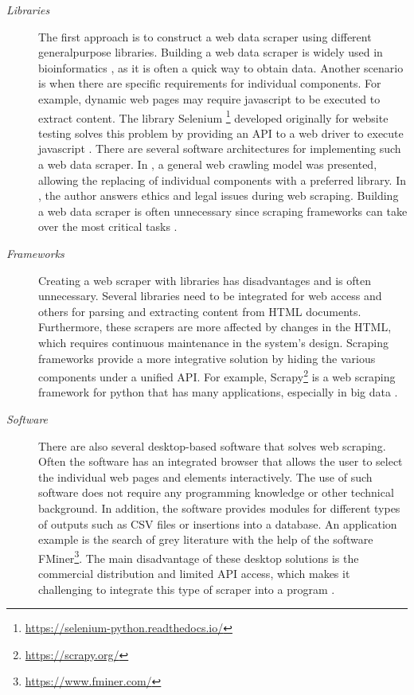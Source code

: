\begin{description}
    \item[\textit{Libraries}]\label{itm:libraries} The first approach is to construct a web data scraper using different general\-purpose libraries.
    Building a web data scraper is widely used in bioinformatics \cite{glez2014web}, as it is often a quick way to obtain data.
    Another scenario is when there are specific requirements for individual components.
    For example, dynamic web pages may require javascript to be executed to extract content.
    The library Selenium \footnote{\url{https://selenium-python.readthedocs.io/}} developed originally for website testing solves this problem by providing an \ac{API} to a web driver to execute javascript \cite{mitchell2018web}.
    There are several software architectures for implementing such a web data scraper.
    In \cite{mitchell2018web}, a general web crawling model was presented, allowing the replacing of individual components with a preferred library.
    In \cite{mahto2016dive}, the author answers ethics and legal issues during web scraping.
    Building a web data scraper is often unnecessary since scraping frameworks can take over the most critical tasks \cite{mitchell2018web}.
    \item[\textit{Frameworks}]\label{itm:frameworks} Creating a web scraper with libraries has disadvantages and is often unnecessary.
    Several libraries need to be integrated for web access and others for parsing and extracting content from \ac{HTML} documents.
    Furthermore, these scrapers are more affected by changes in the \ac{HTML}, which requires continuous maintenance in the system's design.
    Scraping frameworks provide a more integrative solution by hiding the various components under a unified \ac{API}.
    For example, Scrapy\footnote{\url{https://scrapy.org/}} is a web scraping framework for python that has many applications, especially in big data \cite{chaulagain2017cloud, landers2016primer}.
    \item[\textit{Software}]\label{itm:software} There are also several desktop-based software that solves web scraping.
    Often the software has an integrated browser that allows the user to select the individual web pages and elements interactively.
    The use of such software does not require any programming knowledge or other technical background.
    In addition, the software provides modules for different types of outputs such as CSV files or insertions into a database.
    An application example is the search of grey literature \cite{haddaway2015use} with the help of the software FMiner\footnote{\url{https://www.fminer.com/}}.
    The main disadvantage of these desktop solutions is the commercial distribution and limited \ac{API} access, which makes it challenging to integrate this type of scraper into a program \cite{glez2014web}.
\end{description}

